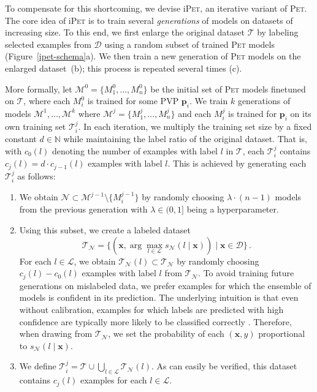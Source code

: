 To compensate for this shortcoming, we devise i\textsc{Pet}, an iterative variant of \textsc{Pet}. The core idea of i\textsc{Pet} is to train several \emph{generations} of models on datasets of increasing size. To this end, we first enlarge the original dataset $\mathcal{T}$ by labeling selected examples from $\mathcal{D}$ using a random subset of trained \textsc{Pet} models (Figure~\ref{ipet-schema}a). We then train a new generation of \textsc{Pet} models on the enlarged dataset~(b); this process is repeated several times (c).

More formally, let $\mathcal{M}^0 = \{ M_1^0, \ldots, M_n^0 \}$ be the initial set of \textsc{Pet} models finetuned on $\mathcal{T}$, where each $M_i^0$ is trained for some PVP $\mathbf{p}_i$. We train $k$ generations of models $\mathcal{M}^1, \ldots, \mathcal{M}^k$ where $\mathcal{M}^j = \{ M_1^j, \ldots, M_n^j \}$ and each $M_i^j$ is trained for $\mathbf{p}_i$ on its own training set $\mathcal{T}_i^j$. In each iteration, we multiply the training set size by a fixed constant $d \in \mathbb{N}$ while maintaining the label ratio of the original dataset. That is, with $c_0(l)$ denoting the number of examples with label $l$ in $\mathcal{T}$, each $\mathcal{T}_i^j$ contains $c_j(l) = d \cdot c_{j-1}(l)$ examples with label $l$. This is achieved by generating each $\mathcal{T}_i^j$ as follows:

\begin{enumerate}
\item We obtain $\mathcal{N} \subset \mathcal{M}^{j-1} \setminus \{ M_i^{j-1} \}$ by randomly choosing $\lambda \cdot (n-1)$ models from the previous generation with $\lambda \in (0,1]$ being a hyperparameter.
\item Using this subset, we create a labeled dataset 
\[
{\mathcal{T}}_\mathcal{N} = \{ (\mathbf{x}, \arg\max_{l \in \mathcal{L}} s_\mathcal{N} (l \mid \mathbf{x})) \mid \mathbf{x} \in \mathcal{D} \}\,.\]
For each $l \in \mathcal{L}$, we obtain $\mathcal{T}_\mathcal{N}(l) \subset \mathcal{T}_\mathcal{N}$ by randomly choosing $c_j(l) - c_0(l)$ examples with label $l$ from $\mathcal{T}_\mathcal{N}$. To avoid training future generations on mislabeled data, we prefer examples for which the ensemble of models is confident in its prediction. The underlying intuition is that even without calibration, examples for which labels are predicted with high confidence are typically more likely to be classified correctly \citep{guo2017calibration}. Therefore, when drawing from $\mathcal{T}_\mathcal{N}$, we set the probability of each $(\mathbf{x}, y)$ proportional to $s_\mathcal{N}(l \mid \mathbf{x})$.
\item We define $\mathcal{T}_i^j
= \mathcal{T} \cup \bigcup_{l \in \mathcal{L}} \mathcal{T}_\mathcal{N}(l)$.
As can easily be verified, this dataset contains $c_j(l)$ examples for each $l \in \mathcal{L}$.
\end{enumerate}

